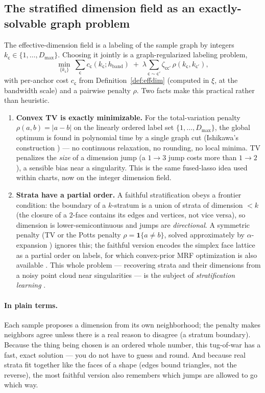 \documentclass[11pt]{article}
\theoremstyle{definition}
\theoremstyle{plain}
\theoremstyle{remark}
\newcommand{\1}{\mathbf{1}}
\newcommand{\cc}{\mathsf{c}}              %
\newcommand{\abs}[1]{\lvert #1 \rvert}
\begin{document}
\subsection{The stratified dimension field as an exactly-solvable graph problem}
\label{sec:fieldsolve}

The effective-dimension field is a labeling of the sample graph by integers
$k_\cc\in\{1,\dots,D_{\max}\}$. Choosing it jointly is a graph-regularized
labeling problem,
\[
  \min_{\{k_\cc\}}\ \sum_{\cc} c_\cc(k_\cc;h_{\mathrm{band}})
  \;+\;\lambda\!\!\sum_{\cc\sim\cc'}\!\!\zeta_{\cc\cc'}\,\rho(k_\cc,k_{\cc'}),
\]
with per-anchor cost $c_\cc$ from Definition~\ref{def:effdim} (computed in $\xi$,
at the bandwidth scale) and a pairwise penalty $\rho$. Two facts make this
practical rather than heuristic.
\begin{enumerate}[leftmargin=1.5em]
\item \textbf{Convex TV is exactly minimizable.} For the total-variation penalty
  $\rho(a,b)=\abs{a-b}$ on the linearly ordered label set
  $\{1,\dots,D_{\max}\}$, the global optimum is found in polynomial time by a
  single graph cut (Ishikawa's construction \cite{ishikawa}) --- no continuous
  relaxation, no rounding, no local minima. TV penalizes the \emph{size} of a
  dimension jump (a $1\!\to\!3$ jump costs more than $1\!\to\!2$), a sensible bias
  near a singularity. This is the same fused-lasso \cite{fusedlasso} idea used
  within charts, now on the integer dimension field.
\item \textbf{Strata have a partial order.} A faithful stratification obeys a
  frontier condition: the boundary of a $k$-stratum is a union of strata of
  dimension $<k$ (the closure of a $2$-face contains its edges and vertices, not
  vice versa), so dimension is lower-semicontinuous and jumps are
  \emph{directional}. A symmetric penalty (TV or the Potts penalty
  $\rho=\1\{a\neq b\}$, solved approximately by $\alpha$-expansion \cite{boykov})
  ignores this; the faithful version encodes the simplex face lattice as a partial
  order on labels, for which convex-prior MRF optimization is also available
  \cite{poformrf}. This whole problem --- recovering strata and their dimensions
  from a noisy point cloud near singularities --- is the subject of
  \emph{stratification learning} \cite{stratlearn,localhomology}.
\end{enumerate}

\paragraph{In plain terms.}
Each sample proposes a dimension from its own neighborhood; the penalty makes
neighbors agree unless there is a real reason to disagree (a stratum boundary).
Because the thing being chosen is an ordered whole number, this tug-of-war has a
fast, exact solution --- you do not have to guess and round. And because real
strata fit together like the faces of a shape (edges bound triangles, not the
reverse), the most faithful version also remembers which jumps are allowed to go
which way.
\end{document}
